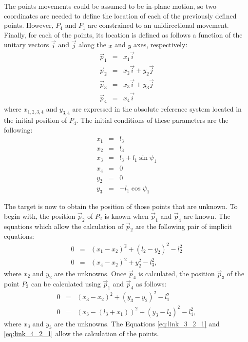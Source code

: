     The points movements could be assumed to be in-plane motion, so two coordinates are needed to define the location of each of the previously defined points. However, $P_4$ and $P_1$ are constrained to an unidirectional movement. Finally, for each of the points, its location is defined as follows a function of the unitary vectors $\vec{i}$ and $\vec{j}$ along the $x$ and $y$ axes, respectively:
    \begin{eqnarray}
      \vec{p}_1 &=& x_1 \vec{i} \nonumber \\
      \vec{p}_2 &=& x_2 \vec{i} + y_2 \vec{j} \nonumber \\
      \vec{p}_3 &=& x_3 \vec{i} + y_3 \vec{j} \nonumber \\
      \vec{p}_4 &=& x_4 \vec{i}
    \end{eqnarray}
    \noindent
    where $x_{1,2,3,4}$ and $y_{3,4}$ are expressed in the absolute reference system located in the initial position of $P_4$. The initial conditions of these parameters are the following:
    \begin{eqnarray}
      x_1 &=& l_3 \nonumber \\
      x_2 &=& l_3 \nonumber \\
      x_3 &=& l_3 + l_1 \sin \psi_1 \nonumber \\
      x_4 &=& 0 \nonumber \\
      y_2 &=& 0 \nonumber \\
      y_3 &=& - l_1 \cos \psi_1
    \end{eqnarray}

    The target is now to obtain the position of those points that are unknown. To begin with, the position $\vec{p}_2$ of $P_2$ is known when $\vec{p}_1$ and $\vec{p}_4$ are known. The equations which allow the calculation of $\vec{p}_2$ are the following pair of implicit equations:
    \begin{eqnarray}
      0 &=& (x_1 - x_2)^2 + (l_2 - y_2)^2 - l_2^2 \nonumber \\
      0 &=& (x_4 - x_2)^2 + y_2^2 - l_3^2,
      \label{eq:link_4_2_1}
    \end{eqnarray}
    \noindent
    where $x_2$ and $y_2$ are the unknowns. Once $\vec{p}_4$ is calculated, the position $\vec{p}_3$ of the point $P_3$ can be calculated using $\vec{p}_1$ and $\vec{p}_4$ as follows:
    \begin{eqnarray}
      0 &=& (x_3 - x_2)^2 + (y_3 - y_2)^2 - l_1^2 \nonumber \\
      0 &=& (x_3 - (l_3 +x_1))^2 + (y_3 - l_2)^2 - l_4^2,
      \label{eq:link_3_2_1}
    \end{eqnarray}
    \noindent
    where $x_3$ and $y_3$ are the unknowns. The Equations \ref{eq:link_3_2_1} and \ref{eq:link_4_2_1} allow the calculation of the points.

